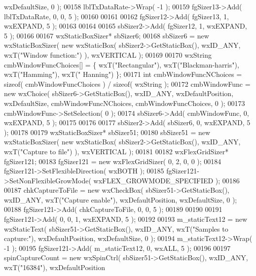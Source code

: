 \begin{DoxyCode}
       wxDefaultSize, 0 );
00158     lblTxDataRate->Wrap( -1 );
00159     fgSizer13->Add( lblTxDataRate, 0, 0, 5 );
00160     
00161     
00162     fgSizer12->Add( fgSizer13, 1, wxEXPAND, 5 );
00163     
00164     
00165     sbSizer2->Add( fgSizer12, 1, wxEXPAND, 5 );
00166     
00167     wxStaticBoxSizer* sbSizer6;
00168     sbSizer6 = \textcolor{keyword}{new} wxStaticBoxSizer( \textcolor{keyword}{new} wxStaticBox( sbSizer2->GetStaticBox(), wxID\_ANY, wxT(\textcolor{stringliteral}{"Window
       function:"}) ), wxVERTICAL );
00169     
00170     wxString cmbWindowFuncChoices[] = \{ wxT(\textcolor{stringliteral}{"Rectangular"}), wxT(\textcolor{stringliteral}{"Blackman-harris"}), wxT(\textcolor{stringliteral}{"Hamming"}), wxT(\textcolor{stringliteral}{"
      Hanning"}) \};
00171     \textcolor{keywordtype}{int} cmbWindowFuncNChoices = \textcolor{keyword}{sizeof}( cmbWindowFuncChoices ) / \textcolor{keyword}{sizeof}( wxString );
00172     cmbWindowFunc = \textcolor{keyword}{new} wxChoice( sbSizer6->GetStaticBox(), wxID\_ANY, wxDefaultPosition, wxDefaultSize, 
      cmbWindowFuncNChoices, cmbWindowFuncChoices, 0 );
00173     cmbWindowFunc->SetSelection( 0 );
00174     sbSizer6->Add( cmbWindowFunc, 0, wxEXPAND, 5 );
00175     
00176     
00177     sbSizer2->Add( sbSizer6, 0, wxEXPAND, 5 );
00178     
00179     wxStaticBoxSizer* sbSizer51;
00180     sbSizer51 = \textcolor{keyword}{new} wxStaticBoxSizer( \textcolor{keyword}{new} wxStaticBox( sbSizer2->GetStaticBox(), wxID\_ANY, wxT(\textcolor{stringliteral}{"Capture to
       file"}) ), wxVERTICAL );
00181     
00182     wxFlexGridSizer* fgSizer121;
00183     fgSizer121 = \textcolor{keyword}{new} wxFlexGridSizer( 0, 2, 0, 0 );
00184     fgSizer121->SetFlexibleDirection( wxBOTH );
00185     fgSizer121->SetNonFlexibleGrowMode( wxFLEX\_GROWMODE\_SPECIFIED );
00186     
00187     chkCaptureToFile = \textcolor{keyword}{new} wxCheckBox( sbSizer51->GetStaticBox(), wxID\_ANY, wxT(\textcolor{stringliteral}{"Capture enable"}), 
      wxDefaultPosition, wxDefaultSize, 0 );
00188     fgSizer121->Add( chkCaptureToFile, 0, 0, 5 );
00189     
00190     
00191     fgSizer121->Add( 0, 0, 1, wxEXPAND, 5 );
00192     
00193     m_staticText12 = \textcolor{keyword}{new} wxStaticText( sbSizer51->GetStaticBox(), wxID\_ANY, wxT(\textcolor{stringliteral}{"Samples to capture:"}), 
      wxDefaultPosition, wxDefaultSize, 0 );
00194     m_staticText12->Wrap( -1 );
00195     fgSizer121->Add( m_staticText12, 0, wxALL, 5 );
00196     
00197     spinCaptureCount = \textcolor{keyword}{new} wxSpinCtrl( sbSizer51->GetStaticBox(), wxID\_ANY, wxT(\textcolor{stringliteral}{"16384"}), wxDefaultPosition

\end{DoxyCode}
